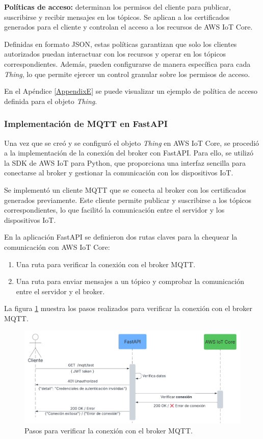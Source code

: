\textbf{Políticas de acceso:} determinan los permisos del cliente para publicar,
suscribirse y recibir mensajes en los tópicos. Se aplican a los certificados
generados para el cliente y controlan el acceso a los recursos de AWS IoT Core.

Definidas en formato JSON, estas políticas garantizan que solo los clientes
autorizados puedan interactuar con los recursos y operar en los tópicos
correspondientes. Además, pueden configurarse de manera específica para cada
\textit{Thing}, lo que permite ejercer un control granular sobre los permisos
de acceso.

En el Apéndice \ref{AppendixE} se puede visualizar un ejemplo de política de
acceso definida para el objeto \textit{Thing}.

\subsubsection{Implementación de MQTT en FastAPI}
Una vez que se creó y se configuró el objeto \textit{Thing} en AWS IoT Core, se
procedió a la implementación de la conexión del broker con FastAPI. Para ello,
se utilizó la SDK de AWS IoT para Python, que proporciona una interfaz sencilla
para conectarse al broker y gestionar la comunicación con los dispositivos IoT.

Se implementó un cliente MQTT que se conecta al broker con los certificados
generados previamente. Este cliente permite publicar y suscribirse a los
tópicos correspondientes, lo que facilitó la comunicación entre el servidor y
los dispositivos IoT.

En la aplicación FastAPI se definieron dos rutas claves para la chequear la
comunicación con AWS IoT Core:

\begin{enumerate}
    \item Una ruta para verificar la conexión con el broker MQTT.
    \item Una ruta para enviar mensajes a un tópico y comprobar la comunicación entre el
          servidor y el broker.
\end{enumerate}

La figura \ref{fig:test_mqtt} muestra los pasos realizados para verificar la
conexión con el broker MQTT.

\begin{figure}[H]
    \centering
    \includegraphics[width=.90\textwidth]{./Images/20.png}
    \caption{Pasos para verificar la conexión con el broker MQTT.}
    \label{fig:test_mqtt}
\end{figure}

